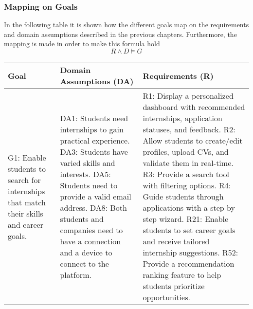 \subsubsection{Mapping on Goals}
In the following table it is shown how the different goals map on the requirements and domain assumptions described in the previous chapters. Furthermore, the mapping is made in order to make this formula hold 
\begin{equation}
R \land D \models G
\end{equation}
\begin{longtable}{| p{} | p{} | p{} |}
\hline
\textbf{Goal} & \textbf{Domain Assumptions (DA)} & \textbf{Requirements (R)} \\ 
\hline
G1: Enable students to search for internships that match their skills and career goals. & DA1: Students need internships to gain practical experience. \newline DA3: Students have varied skills and interests. \newline DA5: Students need to provide a valid email address. \newline DA8: Both students and companies need to have a connection and a device to connect to the platform. & R1: Display a personalized dashboard with recommended internships, application statuses, and feedback. \newline R2: Allow students to create/edit profiles, upload CVs, and validate them in real-time. \newline R3: Provide a search tool with filtering options. \newline R4: Guide students through applications with a step-by-step wizard. \newline R21: Enable students to set career goals and receive tailored internship suggestions. \newline R52: Provide a recommendation ranking feature to help students prioritize opportunities. \\ \hline


\end{longtable}
